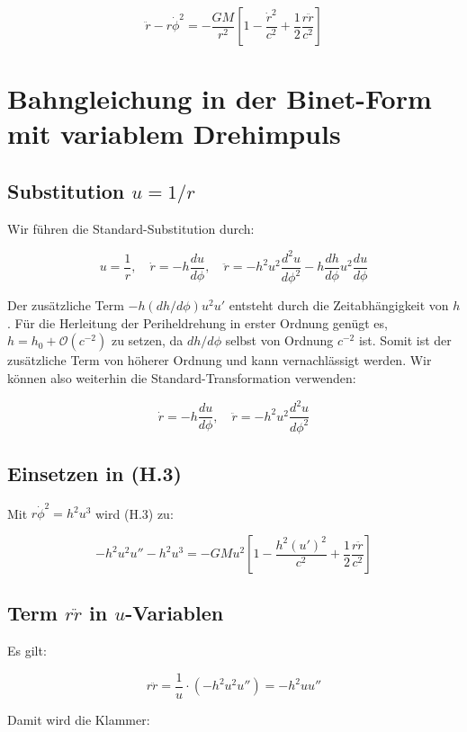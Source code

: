 \[
\ddot{r} - r\dot{\phi}^2 = -\frac{GM}{r^2} 
\left[ 1 - \frac{\dot{r}^2}{c^2} + \frac{1}{2} \frac{r\ddot{r}}{c^2} \right] \tag{H.3}
\]

\section{Bahngleichung in der Binet-Form mit variablem Drehimpuls}
\label{app:periheldrehung_binet}

\subsection{Substitution \( u = 1/r \)}
\label{sub:periheldrehung_substitution}

Wir führen die Standard-Substitution durch:

\[
u = \frac{1}{r}, \quad \dot{r} = -h \frac{du}{d\phi}, \quad 
\ddot{r} = -h^2 u^2 \frac{d^2 u}{d\phi^2} - h \frac{dh}{d\phi} u^2 \frac{du}{d\phi}
\]

Der zusätzliche Term \( -h (dh/d\phi) u^2 u' \) entsteht durch die 
Zeitabhängigkeit von \( h \). Für die Herleitung der Periheldrehung 
in erster Ordnung genügt es, \( h = h_0 + \mathcal{O}(c^{-2}) \) zu setzen, 
da \( dh/d\phi \) selbst von Ordnung \( c^{-2} \) ist. Somit ist der 
zusätzliche Term von höherer Ordnung und kann vernachlässigt werden. 
Wir können also weiterhin die Standard-Transformation verwenden:

\[
\dot{r} = -h \frac{du}{d\phi}, \quad \ddot{r} = -h^2 u^2 \frac{d^2 u}{d\phi^2}
\]

\subsection{Einsetzen in (H.3)}
\label{sub:periheldrehung_einsetzen}

Mit \( r\dot{\phi}^2 = h^2 u^3 \) wird (H.3) zu:

\[
-h^2 u^2 u'' - h^2 u^3 = -GM u^2 \left[ 1 - \frac{h^2 (u')^2}{c^2} + \frac{1}{2} \frac{r\ddot{r}}{c^2} \right]
\]

\subsection{Term \( r\ddot{r} \) in \( u \)-Variablen}
\label{sub:periheldrehung_rr}

Es gilt:

\[
r\ddot{r} = \frac{1}{u} \cdot (-h^2 u^2 u'') = -h^2 u u''
\]

Damit wird die Klammer:

